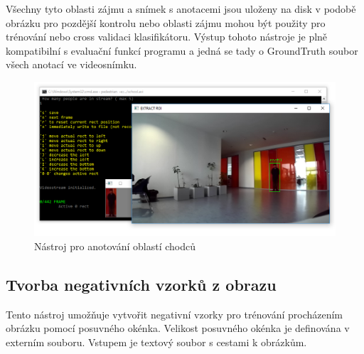 Všechny tyto oblasti zájmu a snímek s anotacemi jsou uloženy na disk v podobě obrázku pro pozdější kontrolu nebo oblasti zájmu mohou být použity pro trénování nebo cross validaci klasifikátoru. Výstup tohoto nástroje je plně kompatibilní s evaluační funkcí programu a jedná se tady o GroundTruth soubor všech anotací ve videosnímku.
 \begin{figure}[H]
\centering
\includegraphics[width=15cm]{figures/annotation_example}
\caption{Nástroj pro anotování oblastí chodců}
\label{tool_anotate}
\end{figure}

\subsection{Tvorba negativních vzorků z obrazu}
Tento nástroj umožňuje vytvořit negativní vzorky pro trénování procházením obrázku pomocí posuvného okénka. Velikost posuvného okénka je definována v externím souboru. Vstupem je textový soubor s cestami k obrázkům.
